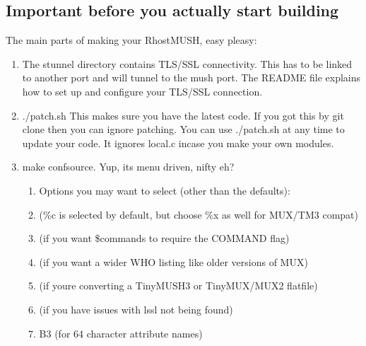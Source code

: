 \documentclass[letterpaper,10pt,english]{sphinxmanual}
\begin{document}
\subsection{Important before you actually start building}
\label{\detokenize{install:important-before-you-actually-start-building}}
\sphinxAtStartPar
The main parts of making your RhostMUSH, easy pleasy:
\begin{enumerate}
%
\item {} 
\sphinxAtStartPar
The stunnel directory contains TLS/SSL connectivity.  This has to be linked to another port and will tunnel to the mush port.  The README file explains how to set up and configure your TLS/SSL connection.

\item {} 
\sphinxAtStartPar
./patch.sh \sphinxhyphen{}\sphinxhyphen{} This makes sure you have the latest code.  If you got this by git clone  then you can ignore patching.  You can use ./patch.sh at any time to update your code.  It ignores local.c incase you make your own modules.

\item {} 
\sphinxAtStartPar
make confsource.  Yup, it\textquotesingle{}s menu driven, nifty eh?
\begin{enumerate}
%
\item {} 
\sphinxAtStartPar
Options you may want to select (other than the defaults):

\item {} 
  (\%c is selected by default, but choose \%x as well for MUX/TM3 compat)

\item {} 
  (if you want \$commands to require the COMMAND flag)

\item {} 
 (if you want a wider WHO listing like older versions of MUX)

\item {} 
 (if you\textquotesingle{}re converting a TinyMUSH3 or TinyMUX/MUX2 flatfile)

\item {} 
 (if you have issues with \sphinxhyphen{}lssl not being found)

\item {} 
\sphinxAtStartPar
B3 (for 64 character attribute names)


\end{enumerate}
\end{enumerate}
\end{document}
